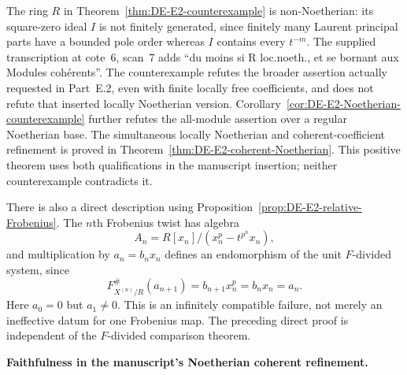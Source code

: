 \begin{remark}\label{rem:DE-E2-Noetherian-scope}
The ring $R$ in Theorem~\ref{thm:DE-E2-counterexample} is non-Noetherian: its square-zero ideal $I$ is not finitely generated, since finitely many Laurent principal parts have a bounded pole order whereas $I$ contains every $t^{-m}$.  The supplied transcription at cote~6, scan~7 adds ``du moins si R loc.noeth., et se bornant aux Modules coh\'erents''.  The counterexample refutes the broader assertion actually requested in Part~E.2, even with finite locally free coefficients, and does not refute that inserted locally Noetherian version.  Corollary~\ref{cor:DE-E2-Noetherian-counterexample} further refutes the all-module assertion over a regular Noetherian base.  The simultaneous locally Noetherian and coherent-coefficient refinement is proved in Theorem~\ref{thm:DE-E2-coherent-Noetherian}.  This positive theorem uses both qualifications in the manuscript insertion; neither counterexample contradicts it.

There is also a direct description using Proposition~\ref{prop:DE-E2-relative-Frobenius}.  The $n$th Frobenius twist has algebra
\[
 A_n=R[x_n]/(x_n^p-t^{p^n}x_n),
\]
and multiplication by $a_n=b_nx_n$ defines an endomorphism of the unit $F$-divided system, since
\[
 F_{X^{(n)}/R}^{\#}(a_{n+1})
       =b_{n+1}x_n^p=b_nx_n=a_n.
\]
Here $a_0=0$ but $a_1\ne0$.  This is an infinitely compatible failure, not merely an ineffective datum for one Frobenius map.  The preceding direct proof is independent of the $F$-divided comparison theorem.
\end{remark}

\par\smallskip\noindent\textbf{Faithfulness in the manuscript's Noetherian coherent refinement.}

